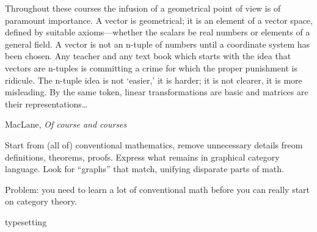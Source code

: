 \documentclass[11pt,openany]{article}
\def \texFolder {../../tex/}
\begin{document}
\setcounter{currentlevel}{\value{baseSectionLevel}}
\label{sec:Abstraction}

\epigraph{Throughout these courses the infusion of a geometrical
point of view is of paramount importance. A vector
is geometrical; it is an element of a vector space, defined
by suitable axioms—whether the scalars be real numbers or
elements of a general field. A vector is not an n-tuple of
numbers until a coordinate system has been chosen. Any
teacher and any text book which starts with the idea that vectors
are n-tuples is committing a crime for which the proper
punishment is ridicule. The n-tuple idea is not ‘easier,’ it is
harder; it is not clearer, it is more misleading. By the same
token, linear transformations are basic and matrices are their
representations\ldots}
{MacLane, \textit{Of course and courses}~\cite{MacLane:1954}}

Start from (all of) conventional mathematics,
remove unnecessary details freom definitions, theorems, proofs.
Express what remains in graphical category language.
Look for ``graphs'' that match, unifying disparate parts of math.

Problem: you need to learn a lot of conventional math before
you can really start on category theory.

 
\pagebreak
\appendix
{typesetting}


%
\printbibliography[heading=bibintoc, title={References}]
\end{document}
